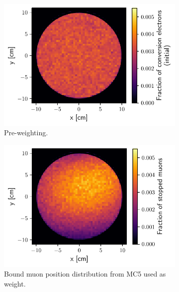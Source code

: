 \begin{figure}
    \centering
    \begin{subfigure}[t]{0.329\textwidth}
        \centering
        \includegraphics[width=\textwidth]{chapter6/initial_conversion_position_distribution.pdf}
        \caption{Pre-weighting.}
    \end{subfigure}
    \hfill
    \begin{subfigure}[t]{0.329\textwidth}
        \centering
        \includegraphics[width=\textwidth]{chapter6/stopped_muon_distribution.pdf}
        \caption{Bound muon position distribution from MC5 used as weight.}
    \end{subfigure}
    \hfill
    \begin{subfigure}[t]{0.329\textwidth}
        \centering

\end{subfigure}
\end{figure}
